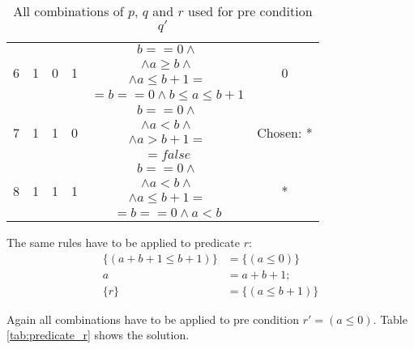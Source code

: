 \begin{table}
\begin{tabular}{ | c | c | c | c | c | c | }
    \multirow{4}{*}{6} & \multirow{4}{*}{1} & \multirow{4}{*}{0} & \multirow{4}{*}{1} & $b == 0 \land $ & \multirow{4}{*}{0} \\
    & & & & $\land a \ge b \land$ & \\
    & & & & $\land a \le b + 1 =$ & \\
    & & & & $= b == 0 \land b \le a \le b + 1$ & \\ \hline

    \multirow{4}{*}{7} & \multirow{4}{*}{1} & \multirow{4}{*}{1} & \multirow{4}{*}{0} & $b == 0 \land $ & \multirow{4}{*}{Chosen: *} \\
    & & & & $\land a < b \land$ & \\
    & & & & $\land a > b + 1 =$ & \\
    & & & & $= false$ & \\ \hline

    \multirow{4}{*}{8} & \multirow{4}{*}{1} & \multirow{4}{*}{1} & \multirow{4}{*}{1} & $b == 0 \land $ & \multirow{4}{*}{*} \\
    & & & & $\land a < b \land$ & \\
    & & & & $\land a \le b + 1 =$ & \\
    & & & & $= b == 0 \land a < b$ & \\ \hline
  \end{tabular}
  \caption{All combinations of $p$, $q$ and $r$ used for pre condition $q'$}
  \label{tab:predicate_q}
\end{table}

The same rules have to be applied to predicate $r$:
\begin{equation}
\begin{array}{rl}
\{ (a + b + 1 \le b + 1) \} &= \{ (a \le 0) \} \\
a &= a + b + 1;\\
\{r\} &= \{ (a \le b + 1) \}
\end{array}
\end{equation}

Again all combinations have to be applied to pre condition $r' = (a \le 0)$. Table \ref{tab:predicate_r} shows the solution.

